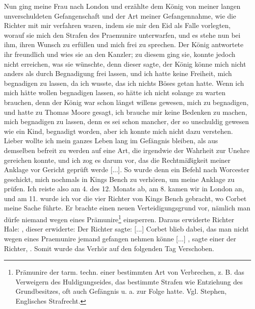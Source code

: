 Nun ging meine Frau nach London und erzählte dem König
von meiner langen unverschuldeten Gefangenschaft und der Art
meiner Gefangennahme, wie die Richter mit mir verfahren waren,
indem sie mir den Eid als Falle vorlegten, worauf sie mich den
Strafen des Praemunire unterwarfen, und es stehe nun bei ihm,
ihren Wunsch zu erfüllen und mich frei zu sprechen. Der König
antwortete ihr freundlich und wies sie an den Kanzler; zu diesem
ging sie, konnte jedoch nicht erreichen, was sie wünschte, denn
dieser sagte, der König könne mich nicht anders als durch Begnadigung 
frei lassen, und ich hatte keine Freiheit, mich begnadigen
zu lassen, da ich wusste, das ich nichts Böses getan hatte. Wenn
ich mich hätte wollen begnadigen lassen, so hätte ich nicht solange
zu warten brauchen, denn der König war schon längst willens 
gewesen, mich zu begnadigen, und hatte zu 
Thomas Moore gesagt,
ich brauche mir keine Bedenken zu machen, mich begnadigen zu
lassen, denn es sei schon mancher, der so unschuldig gewesen wie
ein Kind, begnadigt worden, aber ich konnte mich nicht dazu 
verstehen. Lieber wollte ich mein ganzes Leben lang im Gefängnis
bleiben, als aus demselben befreit zu werden auf eine Art, die
irgendwie der Wahrheit zur Unehre gereichen konnte, und ich zog
es darum vor, das die Rechtmäßigkeit meiner Anklage vor Gericht
geprüft werde [...]. So wurde denn ein Befehl
nach Worcester geschickt, mich nochmals in Kings Bench zu
verhören, um meine Anklage zu prüfen. Ich reiste also am 4.
des 12. Monats ab, am 8. kamen wir in London an, und
am 11. wurde ich vor die vier Richter von Kings Bench 
gebracht, wo Corbet meine Sache führte. Er brachte einen neuen
Verteidigungsgrund vor, nämlich man dürfe niemand wegen eines
Prämunire\footnote{Prämunire der tarm. techn. einer 
bestimmten Art von Verbrechen, z. B. das Verweigern des Huldigungseides, 
das bestimmte Strafen wie Entziehung des Grundbesitzes, oft auch 
Gefängnis u. a. zur Folge hatte. Vgl. Stephen, Englisches Strafrecht.} 
einsperren. Daraus erwiderte Richter Hale: , dieser
erwiderte: 
Der Richter sagte:  [...]
Corbet blieb dabei, das man nicht wegen eines Praemunire
jemand gefangen nehmen könne [...] , sagte einer der
Richter, . Somit wurde das Verhör auf
den folgenden Tag Verschoben.

